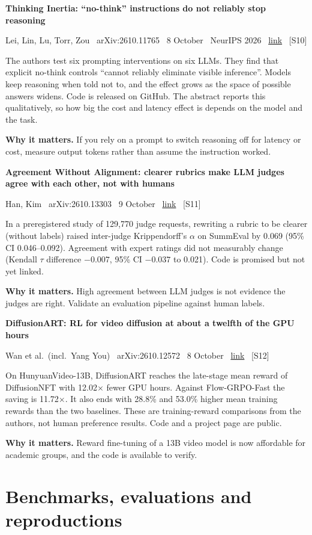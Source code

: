 \documentclass[11pt,a4paper]{article}
\newcommand{\entry}[4]{%
  \par\vspace{0.7em}%
  {\sffamily\bfseries\color{brandink}#1}\par
  {\footnotesize\color{brandgrey}#2 \textbullet\ \href{#3}{link} \textbullet\ \srcref{#4}}\par
  \vspace{0.15em}}
\newcommand{\why}[1]{\par{\small\textbf{Why it matters.} #1}\par}
\newcommand{\srcref}[1]{\textcolor{brandaccent}{[S#1]}}
\begin{document}
\entry{Thinking Inertia: ``no-think'' instructions do not reliably stop reasoning}{Lei, Lin, Lu, Torr, Zou \textbullet\ arXiv:2610.11765 \textbullet\ 8 October \textbullet\ NeurIPS 2026}{https://arxiv.org/abs/2610.11765}{10}
The authors test six prompting interventions on six LLMs. They find that explicit no-think controls
``cannot reliably eliminate visible inference''. Models keep reasoning when told not to, and the
effect grows as the space of possible answers widens. Code is released on GitHub. The abstract reports this
qualitatively, so how big the cost and latency effect is depends on the model and the task.
\why{If you rely on a prompt to switch reasoning off for latency or cost, measure output tokens rather than assume the instruction worked.}

\entry{Agreement Without Alignment: clearer rubrics make LLM judges agree with each other, not with humans}{Han, Kim \textbullet\ arXiv:2610.13303 \textbullet\ 9 October}{https://arxiv.org/abs/2610.13303}{11}
In a preregistered study of 129,770 judge requests, rewriting a rubric to be clearer (without labels) raised
inter-judge Krippendorff's $\alpha$ on SummEval by 0.069 (95\% CI 0.046--0.092). Agreement with
expert ratings did not measurably change (Kendall $\tau$ difference $-0.007$, 95\% CI $-0.037$ to 0.021).
Code is promised but not yet linked.
\why{High agreement between LLM judges is not evidence the judges are right. Validate an evaluation pipeline against human labels.}

\entry{DiffusionART: RL for video diffusion at about a twelfth of the GPU hours}{Wan et al.\ (incl.\ Yang You) \textbullet\ arXiv:2610.12572 \textbullet\ 8 October}{https://arxiv.org/abs/2610.12572}{12}
On HunyuanVideo-13B, DiffusionART reaches the late-stage mean reward of DiffusionNFT with 12.02$\times$ fewer GPU hours.
Against Flow-GRPO-Fast the saving is 11.72$\times$. It also ends with 28.8\% and 53.0\% higher mean training rewards than the two baselines.
These are training-reward comparisons from the authors, not human preference results. Code and a project page are public.
\why{Reward fine-tuning of a 13B video model is now affordable for academic groups, and the code is available to verify.}

\section{Benchmarks, evaluations and reproductions}
\end{document}
